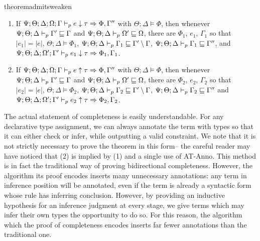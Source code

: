 \begin{restatable}{theorem}{admitsweaken}
~\begin{enumerate}
  \item If $\Psi ; \Theta ; \Delta ; \Omega ; \Gamma \vdash_p e \downarrow \tau \Rightarrow \Phi,\Gamma''$ with $\Theta ; \Delta \vDash \Phi$, then whenever $\Psi ; \Theta ; \Delta \vdash_p \Gamma' \sqsubseteq \Gamma$ and $\Psi ; \Theta ; \Delta \vdash_p \Omega' \sqsubseteq \Omega$, there are $\Phi_1$, $e_1$, $\Gamma_1$ so that $|e_1| = |e|$, $\Theta ; \Delta \vDash \Phi_1$, $\Psi ; \Theta ; \Delta \vdash_p \Gamma_1 \sqsubseteq \Gamma' \setminus \Gamma$, $\Psi ; \Theta ; \Delta \vdash_p \Gamma_1 \sqsubseteq \Gamma''$, and $\Psi ; \Theta ; \Delta ; \Omega' ; \Gamma' \vdash_p e_1 \downarrow \tau \Rightarrow \Phi_1,\Gamma_1$.
  \item If $\Psi ; \Theta ; \Delta ; \Omega ; \Gamma \vdash_p e \uparrow \tau \Rightarrow \Phi,\Gamma''$ with $\Theta ; \Delta \vDash \Phi$, then whenever $\Psi ; \Theta ; \Delta \vdash_p \Gamma' \sqsubseteq \Gamma$ and $\Psi ; \Theta ; \Delta \vdash_p \Omega' \sqsubseteq \Omega$, there are $\Phi_2$, $e_2$, $\Gamma_2$ so that $|e_2| = |e|$, $\Theta ; \Delta \vDash \Phi_2$, $\Psi ; \Theta ; \Delta \vdash_p \Gamma_2 \sqsubseteq \Gamma' \setminus \Gamma$, $\Psi ; \Theta ; \Delta \vdash_p \Gamma_2 \sqsubseteq \Gamma''$ and $\Psi ; \Theta ; \Delta ; \Omega' ; \Gamma' \vdash_p e_2 \uparrow \tau \Rightarrow \Phi_2,\Gamma_2$.
\end{enumerate}
\label{thm:admits-weaken}
\end{restatable}

The actual statement of completeness is easily understandable. For any declarative type assignment, we can always annotate the term with types so that it can either check or infer, while outputting a valid constraint. We note that it is not strictly necessary to prove the theorem in this form-- the careful reader may have noticed that (2) is implied by (1) and a single use of AT-Anno. This method is in fact the traditional way of proving bidirectional completeness. However, the algorithm its proof encodes inserts many unnecessary annotations: any term in inference position will be annotated, even if the term is already a syntactic form whose rule has inferring conclusion. However, by providing an inductive hypothesis for an inference judgment at every stage, we give terms which may infer their own types the opportunity to do so. For this reason, the algorithm which the proof of completeness encodes inserts far fewer annotations than the traditional one.

